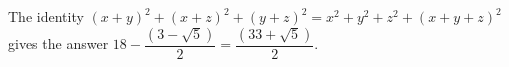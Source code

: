The identity $(x+y)^2+(x+z)^2+(y+z)^2=x^2+y^2+z^2+(x+y+z)^2$ gives the answer $18-\dfrac{(3-\sqrt5)}{2}=\boxed{\dfrac{(33+\sqrt5)}{2}}$.
